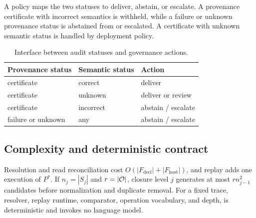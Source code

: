 A policy maps the two statuses to deliver, abstain, or escalate. A provenance
certificate with incorrect semantics is withheld, while a failure or unknown
provenance status is abstained from or escalated. A certificate with unknown
semantic status is handled by deployment policy.

\begin{table}[t]
\centering
\caption{Interface between audit statuses and governance actions.}
\label{tab:policy}
\scriptsize
\setlength{\tabcolsep}{3pt}
\begin{tabular}{@{}lll@{}}
\toprule
Provenance status & Semantic status & Action \\
\midrule
certificate & correct & deliver \\
certificate & unknown & deliver or review \\
certificate & incorrect & abstain / escalate \\
failure or unknown & any & abstain / escalate \\
\bottomrule
\end{tabular}
\end{table}

\subsection{Complexity and deterministic contract}

Resolution and read reconciliation cost
$O(|F_{\mathrm{decl}}|+|F_{\mathrm{host}}|)$, and replay adds one execution
of $P^*$. If $n_j=|S_j|$ and $r=|\mathcal{O}|$, closure level $j$ generates at
most $r n_{j-1}^{2}$ candidates before normalization and duplicate removal.
For a fixed trace, resolver, replay runtime, comparator, operation vocabulary,
and depth, \ledger is deterministic and invokes no language model.


